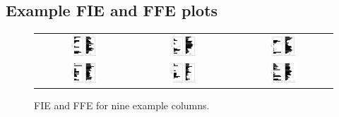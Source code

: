 \documentclass[12pt]{article}
\begin{document}
\subsection*{Example FIE and FFE plots}
\begin{figure}[!htb]
 \caption{FIE and FFE for nine example columns. } 
 \begin{tabular}{ccc}
     \includegraphics[width=0.3\textwidth]{fig/ccf/ccf1} & \includegraphics[width=0.3\textwidth]{fig/ccf/ccf2} & \includegraphics[width=0.3\textwidth]{fig/ccf/ccf3} \\
     \includegraphics[width=0.3\textwidth]{fig/ccf/ccf4} & \includegraphics[width=0.3\textwidth]{fig/ccf/ccf5} & \includegraphics[width=0.3\textwidth]{fig/ccf/ccf6} \\

\end{tabular}
\end{figure}
\end{document}
